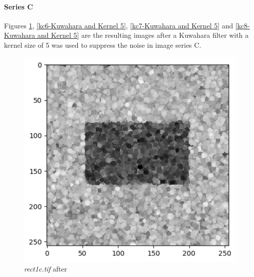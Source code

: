 \documentclass[runningheads]{llncs}
\begin{document}
\paragraph*{\textbf{Series C}}
Figures \ref{kc5-Kuwahara and Kernel 5}, \ref{kc6-Kuwahara and Kernel 5},  \ref{kc7-Kuwahara and Kernel 5} and \ref{kc8-Kuwahara and Kernel 5} are the resulting images after a Kuwahara filter with a kernel size of 5 was used to suppress the noise in image series C. 
\begin{figure}[h!]
\begin{minipage}[h]{0.47\linewidth}
\begin{center}
\includegraphics[width=1\linewidth]{Report/Result_Images/image_kc5.png} 
\caption{\emph{rect1c.tif} after}
\label{kc5-Kuwahara and Kernel 5}
\end{center} 
\end{minipage}
\hfill
\vspace{0.2 cm}
\begin{minipage}[h]{0.47\linewidth}
\begin{center}

\end{center}
\end{minipage}
\end{figure}
\end{document}
